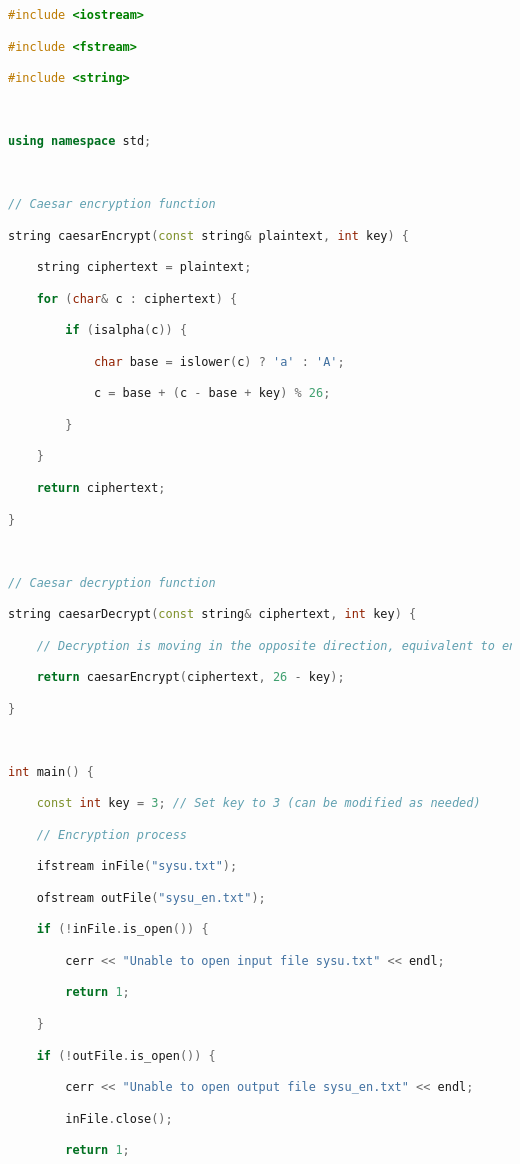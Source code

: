 \begin{lstlisting}[language=C++]
#include <iostream>

#include <fstream>

#include <string>

  

using namespace std;

  

// Caesar encryption function

string caesarEncrypt(const string& plaintext, int key) {

    string ciphertext = plaintext;

    for (char& c : ciphertext) {

        if (isalpha(c)) {

            char base = islower(c) ? 'a' : 'A';

            c = base + (c - base + key) % 26;

        }

    }

    return ciphertext;

}

  

// Caesar decryption function

string caesarDecrypt(const string& ciphertext, int key) {

    // Decryption is moving in the opposite direction, equivalent to encrypting with 26-key

    return caesarEncrypt(ciphertext, 26 - key);

}

  

int main() {

    const int key = 3; // Set key to 3 (can be modified as needed)

    // Encryption process

    ifstream inFile("sysu.txt");

    ofstream outFile("sysu_en.txt");

    if (!inFile.is_open()) {

        cerr << "Unable to open input file sysu.txt" << endl;

        return 1;

    }

    if (!outFile.is_open()) {

        cerr << "Unable to open output file sysu_en.txt" << endl;

        inFile.close();

        return 1;


\end{lstlisting}
